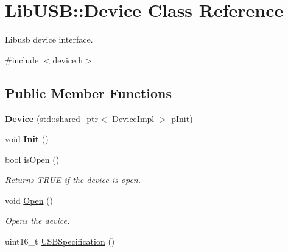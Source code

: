 \hypertarget{class_lib_u_s_b_1_1_device}{\section{Lib\-U\-S\-B\-:\-:Device Class Reference}
\label{class_lib_u_s_b_1_1_device}
}


Libusb device interface.  




{\ttfamily \#include $<$device.\-h$>$}

\subsection*{Public Member Functions}
\begin{DoxyCompactItemize}
\item 
\hypertarget{class_lib_u_s_b_1_1_device_aeaa204a15758e97814f22daef0620bbe}{{\bfseries Device} (std\-::shared\-\_\-ptr$<$ Device\-Impl $>$ p\-Init)}\label{class_lib_u_s_b_1_1_device_aeaa204a15758e97814f22daef0620bbe}

\item 
\hypertarget{class_lib_u_s_b_1_1_device_a243abe3304f5b0df560c1c1d4996fc27}{void {\bfseries Init} ()}\label{class_lib_u_s_b_1_1_device_a243abe3304f5b0df560c1c1d4996fc27}

\item 
\hypertarget{class_lib_u_s_b_1_1_device_aab5f0f101c8ca3e7f3efd22906259a07}{bool \hyperlink{class_lib_u_s_b_1_1_device_aab5f0f101c8ca3e7f3efd22906259a07}{is\-Open} ()}\label{class_lib_u_s_b_1_1_device_aab5f0f101c8ca3e7f3efd22906259a07}

\begin{DoxyCompactList}\small\item\em Returns T\-R\-U\-E if the device is open. \end{DoxyCompactList}\item 
\hypertarget{class_lib_u_s_b_1_1_device_ad3d1cb1906cc40792d91f465d2fa8475}{void \hyperlink{class_lib_u_s_b_1_1_device_ad3d1cb1906cc40792d91f465d2fa8475}{Open} ()}\label{class_lib_u_s_b_1_1_device_ad3d1cb1906cc40792d91f465d2fa8475}

\begin{DoxyCompactList}\small\item\em Opens the device. \end{DoxyCompactList}\item 
\hypertarget{class_lib_u_s_b_1_1_device_a59034f46f295c33e8508fc249d196f3a}{uint16\-\_\-t \hyperlink{class_lib_u_s_b_1_1_device_a59034f46f295c33e8508fc249d196f3a}{U\-S\-B\-Specification} ()}\label{class_lib_u_s_b_1_1_device_a59034f46f295c33e8508fc249d196f3a}


\end{DoxyCompactItemize}
